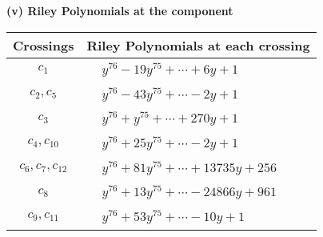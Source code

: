 \documentclass[1p]{elsarticle_modified}
\theoremstyle{definition}
\begin{document}
\newpage\renewcommand{\arraystretch}{1}
\flushleft \textbf{(v) Riley Polynomials at the component}\newline \\
\begin{tabular}{m{50pt}|m{274pt}}
Crossings & \hspace{64pt}Riley Polynomials at each crossing \\
\hline $$\begin{aligned}c_{1}\end{aligned}$$&$\begin{aligned}
&y^{76}-19 y^{75}+\cdots+6 y+1
\end{aligned}$\\
\hline $$\begin{aligned}c_{2},c_{5}\end{aligned}$$&$\begin{aligned}
&y^{76}-43 y^{75}+\cdots-2 y+1
\end{aligned}$\\
\hline $$\begin{aligned}c_{3}\end{aligned}$$&$\begin{aligned}
&y^{76}+y^{75}+\cdots+270 y+1
\end{aligned}$\\
\hline $$\begin{aligned}c_{4},c_{10}\end{aligned}$$&$\begin{aligned}
&y^{76}+25 y^{75}+\cdots-2 y+1
\end{aligned}$\\
\hline $$\begin{aligned}c_{6},c_{7},c_{12}\end{aligned}$$&$\begin{aligned}
&y^{76}+81 y^{75}+\cdots+13735 y+256
\end{aligned}$\\
\hline $$\begin{aligned}c_{8}\end{aligned}$$&$\begin{aligned}
&y^{76}+13 y^{75}+\cdots-24866 y+961
\end{aligned}$\\
\hline $$\begin{aligned}c_{9},c_{11}\end{aligned}$$&$\begin{aligned}
&y^{76}+53 y^{75}+\cdots-10 y+1
\end{aligned}$\\
\hline
\end{tabular}\\~\\
\end{document}
